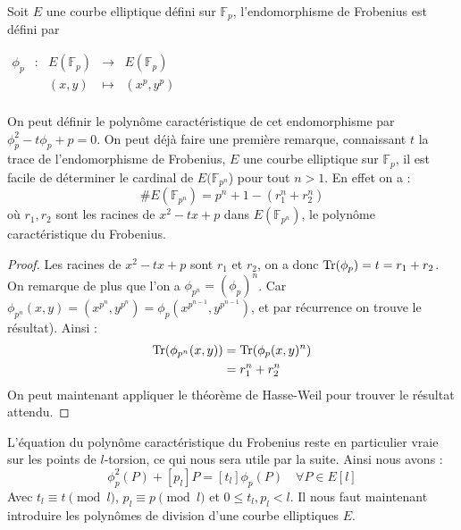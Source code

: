 \documentclass[12pt]{article}
\def\Tr{\mathop{\rm{Tr}}\nolimits}
\begin{document}
\begin{defi}[Frobenius]
Soit $E$ une courbe elliptique défini sur $\mathbb{F}_p$, l'endomorphisme de Frobenius est défini par 

$\begin{array}{ccccc}
\phi_p & : & E(\mathbb{F}_p) & \to & E(\mathbb{F}_p) \\
 & & (x,y) & \mapsto & (x^p, y^p) \\
\end{array}$
\end{defi}
On peut définir le polynôme caractéristique de cet endomorphisme par $\phi_p^2 - t \phi_p + p = 0$.
On peut déjà faire une première remarque, connaissant $t$ la trace de l'endomorphisme de Frobenius, $E$ une courbe elliptique sur $\mathbb{F}_p$, il est facile de déterminer le cardinal de $E(\mathbb{F}_{p^n}$) pour tout $n >1$. En effet on a :
\begin{equation*}
\#E(\mathbb{F}_{p^n}) = p^n + 1- (r_1^n + r_2^n)
\end{equation*}
où $r_1, r_2$ sont les racines de $x^2 - tx +p$ dans $E(\mathbb{F}_{p^n})$, le polynôme caractéristique du Frobenius.
\begin{proof}
Les racines de $x^2 - tx +p$ sont $r_1$ et $r_2$, on a donc $\Tr(\phi_p) = t = r_1 + r_2$. 
\newline
On remarque de plus que l'on a $\phi_{p^n} = (\phi_p)^n$. Car $\phi_{p^n} (x,y) = (x^{p^n}, y^{p^n}) = \phi_p  (x^{p^{n-1}}, y^{p^{n-1}})$, et par récurrence on trouve le résultat).
\newline
Ainsi : 
\begin{align*}
\Tr(\phi_{p^n} (x,y)) &= \Tr(\phi_{p} (x,y)^n) \\
					 &= r_1^n + r_2^n	 
\end{align*}
On peut maintenant appliquer le théorème de Hasse-Weil pour trouver le résultat attendu.
\end{proof}

L'équation du polynôme caractéristique du Frobenius reste en particulier vraie sur les points de $l$-torsion, ce qui nous sera utile par la suite. Ainsi nous avons : 
\begin{equation}
\label{eqnfrobenius}
 \phi_p^2(P)  + [p_l]P = [t_{l}] \phi_p(P) \quad \forall P \in E[l]
\end{equation} 
Avec $t_l \equiv t \pmod l$, $p_l \equiv p \pmod l$ et $0 \leq t_l, p_l < l$. 
\newline
Il nous faut maintenant introduire les polynômes de division d'une courbe elliptiques $E$.
\end{document}
